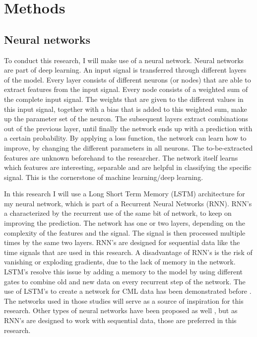 \documentclass[twocolumn, 10pt, a4paper]{article}
\begin{document}
	\section{Methods}
	\subsection{Neural networks}
	To conduct this research, I will make use of a neural network. Neural networks are part of deep learning. An input signal is transferred through different layers of the model. Every layer consists of different neurons (or nodes) that are able to extract features from the input signal. Every node consists of a weighted sum of the complete input signal. The weights that are given to the different values in this input signal, together with a bias that is added to this weighted sum, make up the parameter set of the neuron. 
	The subsequent layers extract combinations out of the previous layer, until finally the network ends up with a prediction with a certain probability. By applying a loss function, the network can learn how to improve, by changing the different parameters in all neurons. The to-be-extracted features are unknown beforehand to the researcher. The network itself learns which features are interesting, separable and are helpful in classifying the specific signal. This is the cornerstone of machine learning/deep learning. 
	
	In this research I will use a Long Short Term Memory (LSTM) architecture for my neural network, which is part of a Recurrent Neural Networks (RNN). RNN's a characterized by the recurrent use of the same bit of network, to keep on improving the prediction. The network has one or two layers, depending on the complexity of the features and the signal. The signal is then processed multiple times by the same two layers. RNN's are designed for sequential data like the time signals that are used in this research. A disadvantage of RNN's is the risk of vanishing or exploding gradients, due to the lack of memory in the network. LSTM's resolve this issue by adding a memory to the model by using different gates to combine old and new data on every recurrent step of the network. The use of LSTM's to create a network for CML data has been demonstrated before \cite{Habi2019, Diba2021, Pudashine2020}. The networks used in those studies will serve as a source of inspiration for this research. Other types of neural networks have been proposed as well \cite{Polz2020}, but as RNN's are designed to work with sequential data, those are preferred in this research.
	
\end{document}
